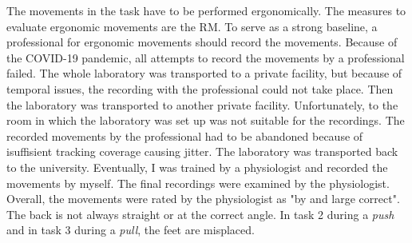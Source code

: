 The movements in the task have to be performed ergonomically. The measures to evaluate ergonomic movements are the RM. To serve as a strong baseline, a professional for ergonomic movements should record the movements. Because of the COVID-19 pandemic, all attempts to record the movements by a professional failed. The whole laboratory was transported to a private facility, but because of temporal issues, the recording with the professional could not take place. Then the laboratory was transported to another private facility. Unfortunately, to the room in which the laboratory was set up was not suitable for the recordings. The recorded movements by the professional had to be abandoned because of isuffisient tracking coverage causing jitter. The laboratory was transported back to the university. Eventually, I was trained by a physiologist and recorded the movements by myself. The final recordings were examined by the physiologist. Overall, the movements were rated by the physiologist as "by and large correct". The back is not always straight or at the correct angle. In task 2 during a \textit{push} and in task 3 during a \textit{pull}, the feet are misplaced.\\

